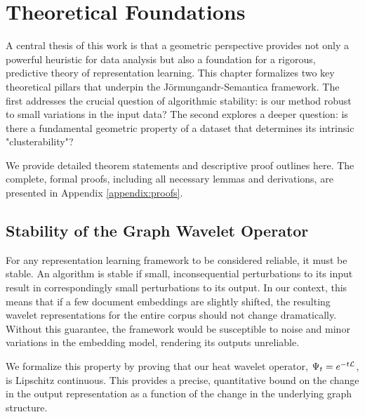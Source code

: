 \chapter{Theoretical Foundations}
\label{chap:theory}

A central thesis of this work is that a geometric perspective provides not only a powerful heuristic for data analysis but also a foundation for a rigorous, predictive theory of representation learning. This chapter formalizes two key theoretical pillars that underpin the Jörmungandr-Semantica framework. The first addresses the crucial question of algorithmic stability: is our method robust to small variations in the input data? The second explores a deeper question: is there a fundamental geometric property of a dataset that determines its intrinsic "clusterability"?

We provide detailed theorem statements and descriptive proof outlines here. The complete, formal proofs, including all necessary lemmas and derivations, are presented in Appendix \ref{appendix:proofs}.

\section{Stability of the Graph Wavelet Operator}
\label{sec:stability_theory}
For any representation learning framework to be considered reliable, it must be stable. An algorithm is stable if small, inconsequential perturbations to its input result in correspondingly small perturbations to its output. In our context, this means that if a few document embeddings are slightly shifted, the resulting wavelet representations for the entire corpus should not change dramatically. Without this guarantee, the framework would be susceptible to noise and minor variations in the embedding model, rendering its outputs unreliable.

We formalize this property by proving that our heat wavelet operator, $\Psi_t = e^{-t\mathcal{L}}$, is Lipschitz continuous. This provides a precise, quantitative bound on the change in the output representation as a function of the change in the underlying graph structure.

